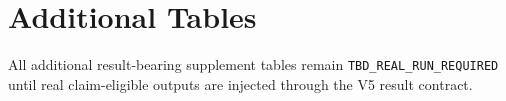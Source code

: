 \section{Additional Tables}

All additional result-bearing supplement tables remain \texttt{TBD\_REAL\_RUN\_REQUIRED} until real claim-eligible outputs are injected through the V5 result contract.
